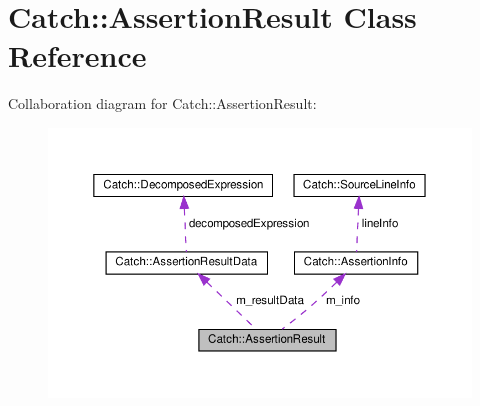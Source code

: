 \hypertarget{classCatch_1_1AssertionResult}{}\section{Catch\+:\+:Assertion\+Result Class Reference}
\label{classCatch_1_1AssertionResult}


Collaboration diagram for Catch\+:\+:Assertion\+Result\+:\nopagebreak
\begin{figure}[H]
\begin{center}
\leavevmode
\includegraphics[width=350pt]{classCatch_1_1AssertionResult__coll__graph}
\end{center}
\end{figure}
